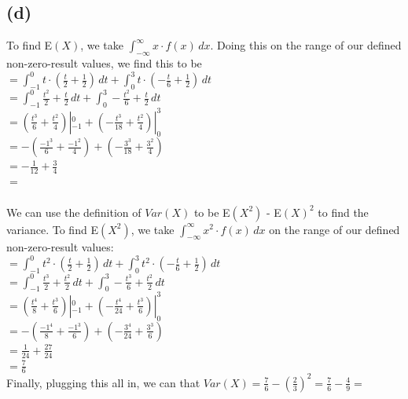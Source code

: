 \documentclass{article}
\begin{document}
{\subsection*{(d)}
To find E$(X)$, we take $\int_{-\infty}^{\infty}x \cdot f(x) \,dx$. Doing this on the range of our defined non-zero-result values, we find this to be \\ 
$ = \int_{-1}^{0} t \cdot (\frac{t}{2} + \frac{1}{2}) \,dt + \int_{0}^{3} t \cdot (-\frac{t}{6} + \frac{1}{2}) \,dt$ \\ 
$ = \int_{-1}^{0} \frac{t^2}{2} + \frac{t}{2} \,dt + \int_{0}^{3} -\frac{t^2}{6} + \frac{t}{2} \,dt$ \\ 
$ = (\frac{t^3}{6} + \frac{t^2}{4})|_{-1}^{0} + (-\frac{t^3}{18} + \frac{t^2}{4})|_{0}^{3}$ \\ 
$ = -(\frac{-1^3}{6} + \frac{-1^2}{4}) + (-\frac{3^3}{18} + \frac{3^2}{4})$ \\ 
$ = -\frac{1}{12} + \frac{3}{4}$ \\ 
$ = $  \\ \\ 
We can use the definition of $Var(X)$ to be E$(X^2)$ - E$(X)^2$ to find the variance. To find E$(X^2)$, we take $\int_{-\infty}^{\infty}x^2 \cdot f(x) \,dx$ on the range of our defined non-zero-result values: \\ 
$ = \int_{-1}^{0} t^2 \cdot (\frac{t}{2} + \frac{1}{2}) \,dt + \int_{0}^{3} t^2 \cdot (-\frac{t}{6} + \frac{1}{2}) \,dt$ \\ 
$ = \int_{-1}^{0} \frac{t^3}{2} + \frac{t^2}{2} \,dt + \int_{0}^{3} -\frac{t^3}{6} + \frac{t^2}{2} \,dt$ \\ 
$ = (\frac{t^4}{8} + \frac{t^3}{6})|_{-1}^{0} + (-\frac{t^4}{24} + \frac{t^3}{6})|_{0}^{3}$ \\ 
$ = -(\frac{-1^4}{8} + \frac{-1^3}{6}) + (-\frac{3^4}{24} + \frac{3^3}{6})$ \\ 
$ = \frac{1}{24} + \frac{27}{24}$ \\ 
$ = \frac{7}{6}$ \\ 
Finally, plugging this all in, we can that $Var(X) = \frac{7}{6} - (\frac{2}{3})^2 = \frac{7}{6} - \frac{4}{9} = $ 

}
\end{document}
